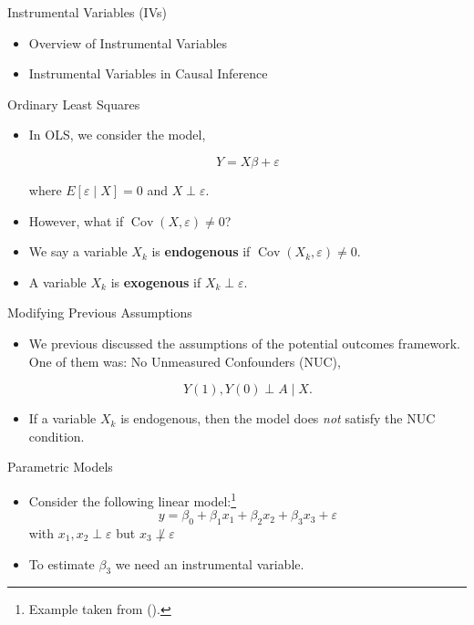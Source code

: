 \documentclass[handout]{beamer} %
\DeclareMathOperator*{\Cov}{Cov}
\begin{document}
\begin{frame}{Instrumental Variables (IVs)}

{

\begin{itemize}
    \item<1> Overview of Instrumental Variables
    \item<0> Instrumental Variables in Causal Inference
\end{itemize}
}

\end{frame}

\begin{frame}{Ordinary Least Squares}

\begin{itemize}
    \item<1-> In OLS, we consider the model,

      \begin{equation}\label{eq:ols}
      Y = X\beta + \varepsilon
      \end{equation}

      where $E[\varepsilon \mid X] = 0$ and $X \perp \varepsilon$.
    \item<2-> However, what if $\Cov(X, \varepsilon) \neq 0$?
    \item<3-> We say a variable $X_k$ is \textbf{endogenous} if $\Cov(X_k,
      \varepsilon) \neq 0$.
    \item<3-> A variable $X_k$ is \textbf{exogenous} if $X_k \perp \varepsilon$.
\end{itemize}

\end{frame}

\begin{frame}{Modifying Previous Assumptions}

\begin{itemize}
    \item We previous discussed the assumptions of the potential outcomes
      framework. One of them was: No Unmeasured Confounders (NUC),

      \[Y(1), Y(0) \perp A \mid X.\]

    \item If a variable $X_k$ is endogenous, then the model does \textit{not} 
      satisfy the NUC condition.
\end{itemize}

\end{frame}

\begin{frame}{Parametric Models}

\begin{itemize}
  \item Consider the following linear model:\footnote{Example taken from
    (\cite{wooldridge2010econometric}).}
      \[y = \beta_0 + \beta_1 x_1 + \beta_2 x_2 + \beta_3 x_3 + \varepsilon\]
      with $x_1, x_2 \perp \varepsilon$ but $x_3 \not\perp \varepsilon$
    \item To estimate $\beta_3$ we need an instrumental variable.
\end{itemize}

\end{frame}
\end{document}
